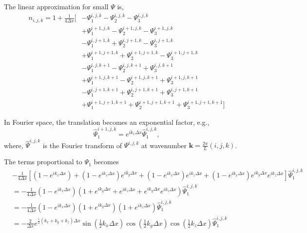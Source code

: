 \documentclass[a4paper,11pt]{article}
\begin{document}
The linear approximation for small $\Psi$ is,
\begin{equation}
  \label{eq:n-linear}
\begin{split}
  n_{i,j,k} = 1 + \frac{1}{4 \Delta x} \Big[
   & - \Psi_1^{i,   j,   k  } - \Psi_2^{i,   j,   k  } - \Psi_3^{i,   j,   k  }\\
   & + \Psi_1^{i+1, j,   k  } - \Psi_2^{i+1, j,   k  } - \Psi_3^{i+1, j,   k  }\\
   & - \Psi_1^{i,   j+1, k  } + \Psi_2^{i,   j+1, k  } - \Psi_3^{i,   j+1, k  }\\
   & + \Psi_1^{i+1, j+1, k  } + \Psi_2^{i+1, j+1, k  } - \Psi_3^{i+1, j+1, k  }\\
   & - \Psi_1^{i,   j  , k+1} - \Psi_2^{i,   j  , k+1} + \Psi_3^{i,   j  , k+1}\\
   & + \Psi_1^{i+1, j  , k+1} - \Psi_2^{i+1, j  , k+1} + \Psi_3^{i+1, j  , k+1}\\
   & - \Psi_1^{i,   j+1, k+1} + \Psi_2^{i,   j+1, k+1} + \Psi_3^{i,   j+1, k+1}\\
   & + \Psi_1^{i+1, j+1, k+1} + \Psi_2^{i+1, j+1, k+1} + \Psi_3^{i+1, j+1, k+1}
   \Big]
\end{split}
\end{equation}

In Fourier space, the translation becomes an exponential factor, e.g., 
\begin{equation}
  \hat{\Psi}_1^{i+1, j, k} = e^{i k_1 \Delta x} \hat{\Psi}_1^{i,j,k},
\end{equation}
where, $\hat{\Psi}^{i,j,k}$ is the Fourier transform of $\Psi^{i, j, k}$
at wavenumber $\bm{k} = \frac{2\pi}{L} (i, j, k)$.

The terms proportional to $\Psi_1$ becomes
\begin{equation}
\begin{split}
  &-\frac{1}{4\Delta x} \left[
    (1 - e^{i k_x \Delta x}) + (1 - e^{i k_x \Delta x}) e^{i k_y \Delta x}
    + (1 - e^{i k_x \Delta x}) e^{i k_z \Delta x}
    + (1 - e^{i k_x \Delta x}) e^{i k_y \Delta x} e^{i k_z \Delta x} \right]
  \hat{\Psi}_1^{i, j, k}\\
  &= -\frac{1}{4 \Delta x}
       (1 - e^{i k_x \Delta x})(1 + e^{i k_y \Delta x} + e^{i k_z \Delta x} +
         e^{i k_y \Delta x} e^{i k_z \Delta x}) \hat{\Psi}_1^{i,j,k}\\
  &= -\frac{1}{4 \Delta x}
         (1 - e^{i k_x \Delta x})(1 + e^{i k_y \Delta x})(1 +  e^{i k_z \Delta x})
         \hat{\Psi}_1^{i,j,k}\\
  &= -\frac{2}{\Delta x} e^{\frac{i}{2} (k_x + k_y + k_z) \Delta x} 
         \sin \left( \frac{1}{2} k_x \Delta x \right)
         \cos \left( \frac{1}{2} k_y \Delta x \right)
         \cos \left(\frac{1}{2} k_z \Delta x \right)
         \hat{\Psi}_1^{i,j,k}
\end{split}
\end{equation}
\end{document}
